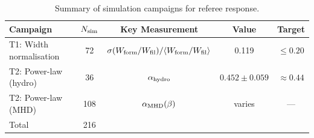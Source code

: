 \begin{table}
\centering
\caption{Summary of simulation campaigns for referee response.}
\label{tab:campaigns}
\begin{tabular}{lcccc}
\hline\hline
Campaign & $N_{\rm sim}$ & Key Measurement & Value & Target \\
\hline
T1: Width normalisation & 72 & $\sigma(W_{\rm form}/W_{\rm fil}) / \langle W_{\rm form}/W_{\rm fil} \rangle$ & 0.119 & $\leq 0.20$ \\
T2: Power-law (hydro) & 36 & $\alpha_{\rm hydro}$ & $0.452 \pm 0.059$ & $\approx 0.44$ \\
T2: Power-law (MHD) & 108 & $\alpha_{\rm MHD}(\beta)$ & varies & --- \\
\hline
Total & 216 & & & \\
\hline\hline
\end{tabular}
\end{table}
